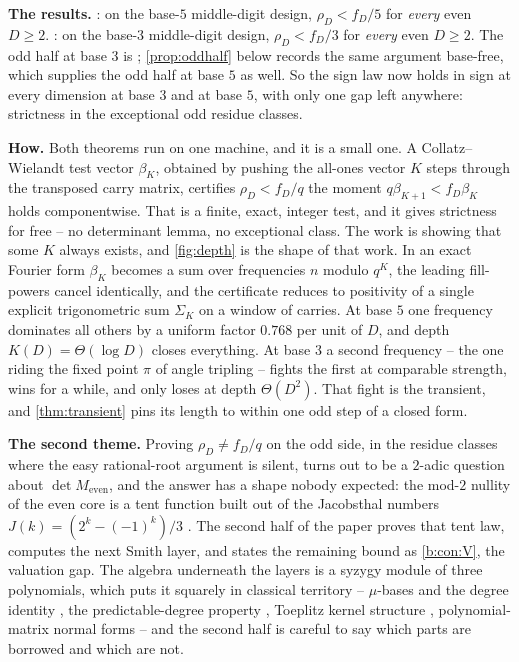 \documentclass[11pt]{amsart}
\theoremstyle{definition}
\theoremstyle{remark}
\begin{document}
\medskip
\noindent\textbf{The results.} : on the base-$5$ middle-digit design, $\rho_D < f_D/5$ for \emph{every} even $D \ge 2$. : on the base-$3$ middle-digit design, $\rho_D < f_D/3$ for \emph{every} even $D \ge 2$. The odd half at base $3$ is \cite{slice-order}; \cref{prop:oddhalf} below records the same argument base-free, which supplies the odd half at base $5$ as well. So the sign law now holds in sign at every dimension at base $3$ and at base $5$, with only one gap left anywhere: strictness in the exceptional odd residue classes.

\medskip
\noindent\textbf{How.} Both theorems run on one machine, and it is a small one. A Collatz--Wielandt test vector $\beta_K$, obtained by pushing the all-ones vector $K$ steps through the transposed carry matrix, certifies $\rho_D < f_D/q$ the moment $q\beta_{K+1} < f_D \beta_K$ holds componentwise. That is a finite, exact, integer test, and it gives strictness for free -- no determinant lemma, no exceptional class. The work is showing that some $K$ always exists, and \cref{fig:depth} is the shape of that work. In an exact Fourier form $\beta_K$ becomes a sum over frequencies $n$ modulo $q^{K}$, the leading fill-powers cancel identically, and the certificate reduces to positivity of a single explicit trigonometric sum $\Sigma_K$ on a window of carries. At base $5$ one frequency dominates all others by a uniform factor $0.768$ per unit of $D$, and depth $K(D) = \Theta(\log D)$ closes everything. At base $3$ a second frequency -- the one riding the fixed point $\pi$ of angle tripling -- fights the first at comparable strength, wins for a while, and only loses at depth $\Theta(D^2)$. That fight is the transient, and \cref{thm:transient} pins its length to within one odd step of a closed form.

\medskip
\noindent\textbf{The second theme.} Proving $\rho_D \ne f_D/q$ on the odd side, in the residue classes where the easy rational-root argument is silent, turns out to be a $2$-adic question about $\det M_{\mathrm{even}}$, and the answer has a shape nobody expected: the mod-$2$ nullity of the even core is a tent function built out of the Jacobsthal numbers $J(k) = (2^k - (-1)^k)/3$ \cite{oeisA001045}. The second half of the paper proves that tent law, computes the next Smith layer, and states the remaining bound as \cref{b:con:V}, the valuation gap. The algebra underneath the layers is a syzygy module of three polynomials, which puts it squarely in classical territory -- $\mu$-bases and the degree identity \cite{csc98,dohm}, the predictable-degree property \cite{forney}, Toeplitz kernel structure \cite{heinig}, polynomial-matrix normal forms \cite{dopico,lindy} -- and the second half is careful to say which parts are borrowed and which are not.
\end{document}
